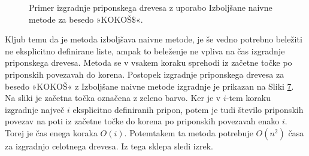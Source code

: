 \begin{figure}[htb]
\begin{subfigure}[t]{0.3\linewidth}
    \subcaption*{}
        
        \centering
        \label{fig:IzbolšanaNaivna1}
    \end{subfigure}
    \hspace{0.5cm}
    \begin{subfigure}[t]{0.3\linewidth}
        \subcaption*{}
        
        \centering
        \label{fig:IzbolšanaNaivna2}
    \end{subfigure}
    \hspace{0.5cm}
    \begin{subfigure}[t]{0.3\linewidth}
        \subcaption*{}
        
        \centering
        \label{fig:IzbolšanaNaivna3}
    \end{subfigure}
    
    \begin{subfigure}[t]{0.3\linewidth}
        \subcaption*{}
        
        \centering
        \label{fig:IzbolšanaNaivna4}
    \end{subfigure}
    \hspace{0.5cm}
    \begin{subfigure}[t]{0.3\linewidth}
        \subcaption*{}
        
        \centering
        \label{fig:IzbolšanaNaivna5}
    \end{subfigure}
    \hspace{0.5cm}
    \begin{subfigure}[t]{0.3\textwidth}
        \subcaption*{}
        
        \centering
        \label{fig:IzbolšanaNaivna6}
    \end{subfigure}

       \caption{Primer izgradnje priponskega drevesa z uporabo Izboljšane naivne metode za besedo »KOKOŠ$\$$«.} 
        \label{fig:IzbolšanaNaivna}
\end{figure}

Kljub temu da je metoda izboljšava naivne metode, je še vedno potrebno beležiti ne eksplicitno definirane liste, ampak to beleženje ne vpliva na čas izgradnje priponskega drevesa. Metoda se v vsakem koraku sprehodi iz začetne točke po priponskih povezavah do korena. Postopek izgradnje priponskega drevesa za besedo »KOKOŠ« z Izboljšane naivne metode izgradnje je prikazan na Sliki \ref{fig:IzbolšanaNaivna}. Na sliki je začetna točka označena z zeleno barvo. Ker je v $i$-tem koraku izgradnje največ $i$ eksplicitno definiranih pripon, potem je tudi število priponskih povezav na poti iz začetne točke do korena po priponskih povezavah enako $i$. Torej je čas enega koraka $O(i)$. Potemtakem ta metoda potrebuje $O(n^2)$ časa za izgradnjo celotnega drevesa. Iz tega sklepa sledi izrek.

